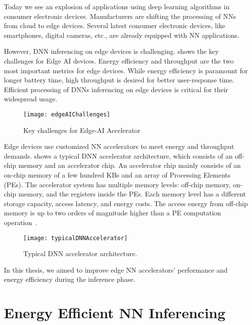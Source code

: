 Today we see an explosion of applications using deep learning algorithms in consumer electronic devices. Manufacturers are shifting the processing of NNs from cloud to edge devices.  Several latest consumer electronic devices, like smartphones, digital cameras, etc., are already equipped with NN applications. 

However, DNN inferencing on edge devices is challenging.  shows the key challenges for Edge AI devices. Energy efficiency and throughput are the two most important metrics for edge devices. While energy efficiency is paramount for longer battery time, high throughput is desired for better user-response time. Efficient processing of DNNs inferencing on edge devices is critical for their widespread usage. 

\begin{figure}[!htb]
	\centering
	\captionsetup{font=sf}
	\texttt{[image: edgeAIChallenges]}
	\caption{Key challenges for Edge-AI Accelerator}
	\label{fig:edgeAIChallenges}
\end{figure}
Edge devices use customized NN accelerators to meet energy and throughput demands.  shows a typical DNN accelerator architecture, which consists of an off-chip memory and an accelerator chip. An accelerator chip mainly consists of an on-chip memory of a few hundred KBs and an array of Processing Elements (PEs). The accelerator system has multiple memory levels: off-chip memory, on-chip memory, and the registers inside the PEs. Each memory level has a different storage capacity, access latency, and energy costs. The access energy from off-chip memory is up to two orders of magnitude higher than a PE computation operation~\cite{Chen2016EyerissAS}. 
\begin{figure}[!htb]
	\centering
	\captionsetup{font=sf}
	\texttt{[image: typicalDNNAccelerator]}
    \caption{Typical DNN accelerator architecture.}
   	\label{fig:typicalDNNAccelerator}
    \vspace{1.0em}
\end{figure}

In this thesis, we aimed to improve edge NN accelerators' performance and energy efficiency during the inference phase.

\section{Energy Efficient NN Inferencing}
